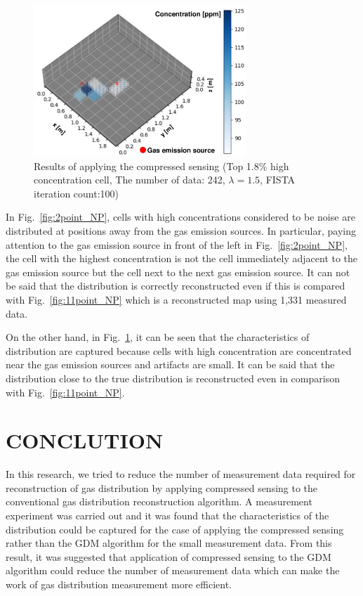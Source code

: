 \documentclass[fleqn,10pt,twocolumn]{SICE19}
\newcommand{\Figref}[1]{Fig.~\ref{#1}}
\begin{document}
\begin{figure}[h]
\begin{center}
\includegraphics[width=80mm]{2point_CS.pdf}
\caption{\label{fig:2point_CS} Results of applying the compressed sensing (Top 1.8\% high concentration cell, The number of data: 242, $\lambda=1.5$, FISTA iteration count:100)}
\end{center}
\end{figure}


In \Figref{fig:2point_NP}, cells with high concentrations considered to be noise are distributed at positions away from the gas emission sources. In particular, paying attention to the gas emission source in front of the left in \Figref{fig:2point_NP}, the cell with the highest concentration is not the cell immediately adjacent to the gas emission source but the cell next to the next gas emission source. It can not be said that the distribution is correctly reconstructed even if this is compared with \Figref{fig:11point_NP} which is a reconstructed map using 1,331 measured data.

On the other hand, in \Figref{fig:2point_CS}, it can be seen that the characteristics of distribution are captured because cells with high concentration are concentrated near the gas emission sources and artifacts are small. It can be said that the distribution close to the true distribution is reconstructed even in comparison with \Figref{fig:11point_NP}.


\section{CONCLUTION}\label{sec:conclition}
In this research, we tried to reduce the number of measurement data required for reconstruction of gas distribution by applying compressed sensing to the conventional gas distribution reconstruction algorithm. A measurement experiment was carried out and it was found that the characteristics of the distribution could be captured for the case of applying the compressed sensing rather than the GDM algorithm for the small measurement data. From this result, it was suggested that application of compressed sensing to the GDM algorithm could reduce the number of measurement data which can make the work of gas distribution measurement more efficient.
\end{document}
